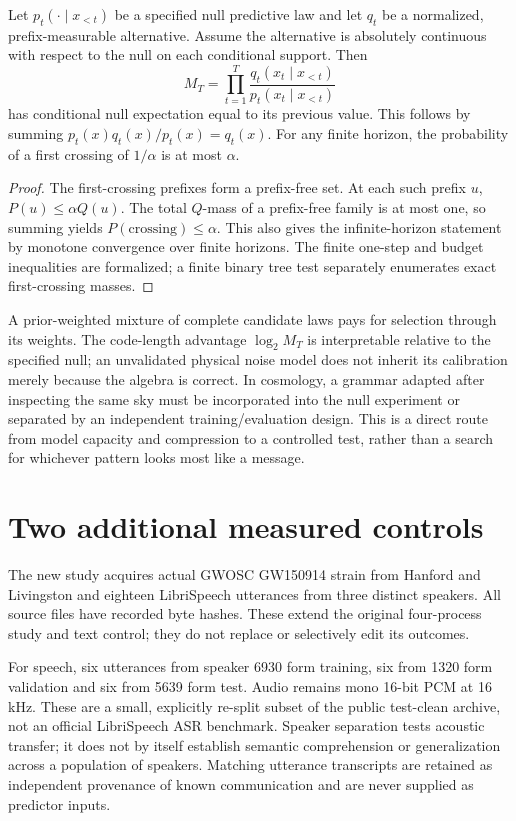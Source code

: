 Let $p_t(\cdot\mid x_{<t})$ be a specified null predictive law and let $q_t$ be a normalized, prefix-measurable alternative. Assume the alternative is absolutely continuous with respect to the null on each conditional support. Then
\[
 M_T=\prod_{t=1}^T\frac{q_t(x_t\mid x_{<t})}{p_t(x_t\mid x_{<t})}
\]
has conditional null expectation equal to its previous value. This follows by summing $p_t(x)q_t(x)/p_t(x)=q_t(x)$. For any finite horizon, the probability of a first crossing of $1/\alpha$ is at most $\alpha$.

\begin{proof}
The first-crossing prefixes form a prefix-free set. At each such prefix $u$, $P(u)\le\alpha Q(u)$. The total $Q$-mass of a prefix-free family is at most one, so summing yields $P(\text{crossing})\le\alpha$. This also gives the infinite-horizon statement by monotone convergence over finite horizons. The finite one-step and budget inequalities are formalized; a finite binary tree test separately enumerates exact first-crossing masses.
\end{proof}

A prior-weighted mixture of complete candidate laws pays for selection through its weights. The code-length advantage $\log_2 M_T$ is interpretable relative to the specified null; an unvalidated physical noise model does not inherit its calibration merely because the algebra is correct. In cosmology, a grammar adapted after inspecting the same sky must be incorporated into the null experiment or separated by an independent training/evaluation design. This is a direct route from model capacity and compression to a controlled test, rather than a search for whichever pattern looks most like a message.

\section{Two additional measured controls}

The new study acquires actual GWOSC GW150914 strain from Hanford and Livingston and eighteen LibriSpeech utterances from three distinct speakers. All source files have recorded byte hashes. These extend the original four-process study and text control; they do not replace or selectively edit its outcomes.

For speech, six utterances from speaker 6930 form training, six from 1320 form validation and six from 5639 form test. Audio remains mono 16-bit PCM at 16 kHz. These are a small, explicitly re-split subset of the public test-clean archive, not an official LibriSpeech ASR benchmark. Speaker separation tests acoustic transfer; it does not by itself establish semantic comprehension or generalization across a population of speakers. Matching utterance transcripts are retained as independent provenance of known communication and are never supplied as predictor inputs.

